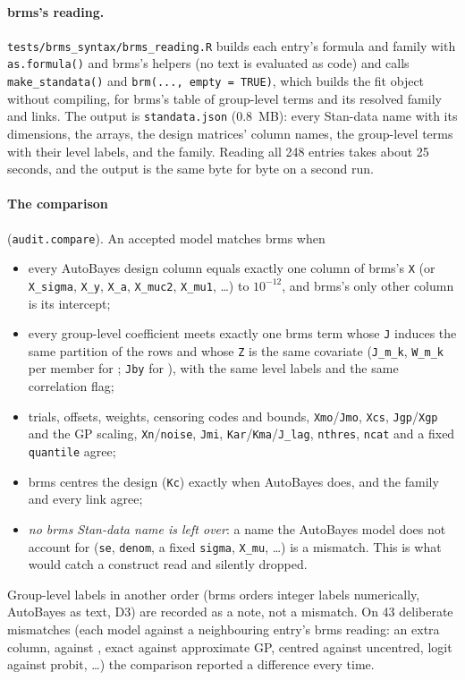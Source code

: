 \documentclass[11pt]{article}
\newcommand{\code}[1]{\texttt{#1}}
\newcommand{\file}[1]{\texttt{#1}}
\newcommand{\f}[1]{\texttt{\detokenize{#1}}}
\begin{document}
\paragraph{brms's reading.} \file{tests/brms\_syntax/brms\_reading.R} builds each entry's formula and family with
\code{as.formula()} and brms's helpers (no text is evaluated as code) and calls \code{make\_standata()} and
\code{brm(..., empty = TRUE)}, which builds the fit object without compiling, for brms's table of group-level terms and
its resolved family and links. The output is \file{standata.json} (0.8~MB): every Stan-data name with its dimensions, the
arrays, the design matrices' column names, the group-level terms with their level labels, and the family. Reading all
248 entries takes about 25 seconds, and the output is the same byte for byte on a second run.

\paragraph{The comparison} (\code{audit.compare}). An accepted model matches brms when
\begin{itemize}
\item every AutoBayes design column equals exactly one column of brms's \code{X} (or \code{X\_sigma}, \code{X\_y},
\code{X\_a}, \code{X\_muc2}, \code{X\_mu1}, \dots) to $10^{-12}$, and brms's only other column is its intercept;
\item every group-level coefficient meets exactly one brms term whose \code{J} induces the same partition of the rows and
whose \code{Z} is the same covariate (\code{J\_m\_k}, \code{W\_m\_k} per member for \f{mm()}; \code{Jby} for \f{by}), with
the same level labels and the same correlation flag;
\item trials, offsets, weights, censoring codes and bounds, \code{Xmo}/\code{Jmo}, \code{Xcs}, \code{Jgp}/\code{Xgp} and
the GP scaling, \code{Xn}/\code{noise}, \code{Jmi}, \code{Kar}/\code{Kma}/\code{J\_lag}, \code{nthres}, \code{ncat} and a
fixed \code{quantile} agree;
\item brms centres the design (\code{Kc}) exactly when AutoBayes does, and the family and every link agree;
\item \emph{no brms Stan-data name is left over}: a name the AutoBayes model does not account for (\code{se},
\code{denom}, a fixed \code{sigma}, \code{X\_mu}, \dots) is a mismatch. This is what would catch a construct read and
silently dropped.
\end{itemize}
Group-level labels in another order (brms orders integer labels numerically, AutoBayes as text, D3) are recorded as a
note, not a mismatch. On 43 deliberate mismatches (each model against a neighbouring entry's brms reading: an extra
column, \f{|} against \f{||}, exact against approximate GP, centred against uncentred, logit against probit, \dots) the
comparison reported a difference every time.
\end{document}
